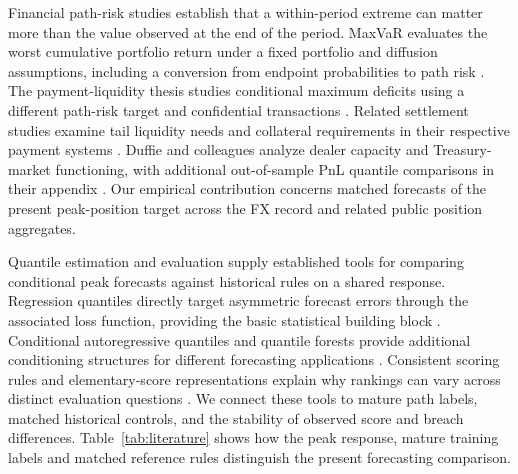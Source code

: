 \documentclass[11pt,a4paper]{article}
\begin{document}
Financial path-risk studies establish that a within-period extreme can matter more than the value observed at the end of the period. MaxVaR evaluates the worst cumulative portfolio return under a fixed portfolio and diffusion assumptions, including a conversion from endpoint probabilities to path risk \citep{boudoukh2004}. The payment-liquidity thesis studies conditional maximum deficits using a different path-risk target and confidential transactions \citep{hoogen2017}. Related settlement studies examine tail liquidity needs and collateral requirements in their respective payment systems \citep{petrunia2019,arjani2020}. Duffie and colleagues analyze dealer capacity and Treasury-market functioning, with additional out-of-sample PnL quantile comparisons in their appendix \citep{duffie2023}. Our empirical contribution concerns matched forecasts of the present peak-position target across the FX record and related public position aggregates.


Quantile estimation and evaluation supply established tools for comparing conditional peak forecasts against historical rules on a shared response. Regression quantiles directly target asymmetric forecast errors through the associated loss function, providing the basic statistical building block \citep{koenker1978}. Conditional autoregressive quantiles and quantile forests provide additional conditioning structures for different forecasting applications \citep{engle2004,meinshausen2006}. Consistent scoring rules and elementary-score representations explain why rankings can vary across distinct evaluation questions \citep{gneiting2011,ehm2016}. We connect these tools to mature path labels, matched historical controls, and the stability of observed score and breach differences. Table~\ref{tab:literature} shows how the peak response, mature training labels and matched reference rules distinguish the present forecasting comparison.
\end{document}
